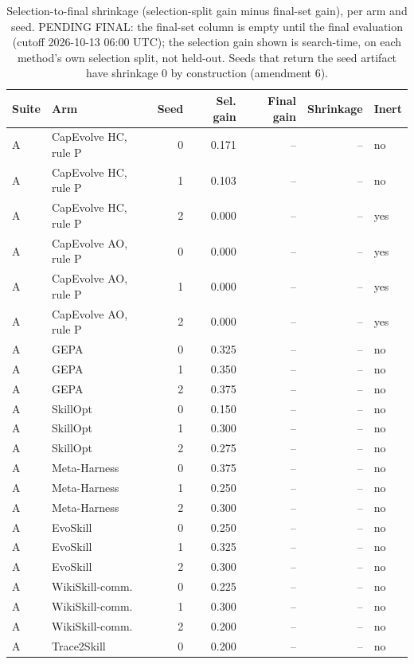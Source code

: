 \begin{table}[t]
\centering
\scriptsize
\caption{Selection-to-final shrinkage (selection-split gain minus final-set gain), per arm and seed. PENDING FINAL: the final-set column is empty until the final evaluation (cutoff 2026-10-13 06:00 UTC); the selection gain shown is search-time, on each method's own selection split, not held-out. Seeds that return the seed artifact have shrinkage 0 by construction (amendment 6).}
\label{tab:attrib-shrinkage}
\begin{tabular}{@{}llrrrrl@{}}
\toprule
Suite & Arm & Seed & Sel. gain & Final gain & Shrinkage & Inert \\
\midrule
A & CapEvolve HC, rule P & 0 & 0.171 & -- & -- & no \\
A & CapEvolve HC, rule P & 1 & 0.103 & -- & -- & no \\
A & CapEvolve HC, rule P & 2 & 0.000 & -- & -- & yes \\
A & CapEvolve AO, rule P & 0 & 0.000 & -- & -- & yes \\
A & CapEvolve AO, rule P & 1 & 0.000 & -- & -- & yes \\
A & CapEvolve AO, rule P & 2 & 0.000 & -- & -- & yes \\
A & GEPA & 0 & 0.325 & -- & -- & no \\
A & GEPA & 1 & 0.350 & -- & -- & no \\
A & GEPA & 2 & 0.375 & -- & -- & no \\
A & SkillOpt & 0 & 0.150 & -- & -- & no \\
A & SkillOpt & 1 & 0.300 & -- & -- & no \\
A & SkillOpt & 2 & 0.275 & -- & -- & no \\
A & Meta-Harness & 0 & 0.375 & -- & -- & no \\
A & Meta-Harness & 1 & 0.250 & -- & -- & no \\
A & Meta-Harness & 2 & 0.300 & -- & -- & no \\
A & EvoSkill & 0 & 0.250 & -- & -- & no \\
A & EvoSkill & 1 & 0.325 & -- & -- & no \\
A & EvoSkill & 2 & 0.300 & -- & -- & no \\
A & WikiSkill-comm. & 0 & 0.225 & -- & -- & no \\
A & WikiSkill-comm. & 1 & 0.300 & -- & -- & no \\
A & WikiSkill-comm. & 2 & 0.200 & -- & -- & no \\
A & Trace2Skill & 0 & 0.200 & -- & -- & no \\

\end{tabular}
\end{table}
